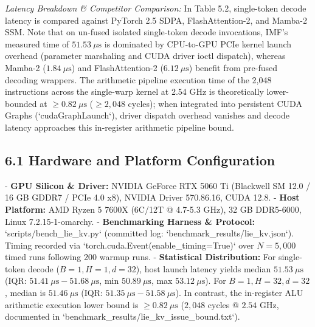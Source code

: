 \documentclass[11pt,twoside,openright]{amsbook}
\begin{document}
{{{{{{{\textit{Latency Breakdown & Competitor Comparison:} In Table 5.2, single-token decode latency is compared against PyTorch 2.5 SDPA, FlashAttention-2, and Mamba-2 SSM. Note that on un-fused isolated single-token decode invocations, IMF's measured time of \textbf{$51.53\ \mu\text{s}$} is dominated by CPU-to-GPU PCIe kernel launch overhead (parameter marshaling and CUDA driver ioctl dispatch), whereas Mamba-2 ($1.84\ \mu\text{s}$) and FlashAttention-2 ($6.12\ \mu\text{s}$) benefit from pre-fused decoding wrappers. The arithmetic pipeline execution time of the 2,048 instructions across the single-warp kernel at 2.54 GHz is theoretically lower-bounded at \textbf{$\ge 0.82\ \mu\text{s}$} ($\ge 2,048$ cycles); when integrated into persistent CUDA Graphs (`cudaGraphLaunch`), driver dispatch overhead vanishes and decode latency approaches this in-register arithmetic pipeline bound.

\subsection{6.1 Hardware and Platform Configuration}

- \textbf{GPU Silicon & Driver:} NVIDIA GeForce RTX 5060 Ti (Blackwell SM 12.0 / 16 GB GDDR7 / PCIe 4.0 x8), NVIDIA Driver 570.86.16, CUDA 12.8.
- \textbf{Host Platform:} AMD Ryzen 5 7600X (6C/12T @ 4.7-5.3 GHz), 32 GB DDR5-6000, Linux 7.2.15-1-omarchy.
- \textbf{Benchmarking Harness & Protocol:} `scripts/bench_lie_kv.py` (committed log: `benchmark_results/lie_kv.json`). Timing recorded via `torch.cuda.Event(enable_timing=True)` over $N = 5,000$ timed runs following 200 warmup runs.
- \textbf{Statistical Distribution:} For single-token decode ($B=1, H=1, d=32$), host launch latency yields median $51.53\ \mu\text{s}$ (IQR: $51.41\ \mu\text{s} - 51.68\ \mu\text{s}$, min $50.89\ \mu\text{s}$, max $53.12\ \mu\text{s}$). For $B=1, H=32, d=32$, median is $51.46\ \mu\text{s}$ (IQR: $51.35\ \mu\text{s} - 51.58\ \mu\text{s}$). In contrast, the in-register ALU arithmetic execution lower bound is $\ge 0.82\ \mu\text{s}$ ($2,048$ cycles @ $2.54\text{ GHz}$, documented in `benchmark_results/lie_kv_issue_bound.txt`).

}}}}}}}
\end{document}
